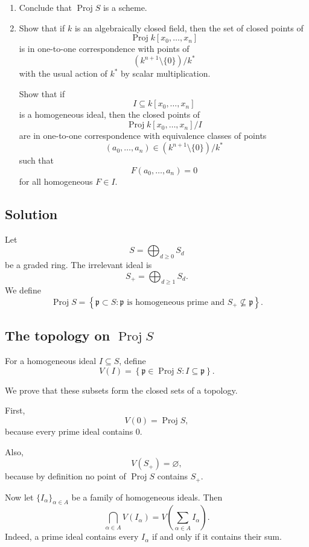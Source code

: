 \begin{enumerate}
\begin{enumerate}
		\item[(c)]
		Conclude that \(\operatorname{Proj} S\) is a scheme.
		
		\item[(d)]
		Show that if \(k\) is an algebraically closed field, then the set of closed points
		of
		\[
		\operatorname{Proj} k[x_0,\dots,x_n]
		\]
		is in one-to-one correspondence with points of
		\[
		(k^{n+1}\setminus\{0\})/k^*
		\]
		with the usual action of \(k^*\) by scalar multiplication.
		
		Show that if
		\[
		I\subseteq k[x_0,\dots,x_n]
		\]
		is a homogeneous ideal, then the closed points of
		\[
		\operatorname{Proj} k[x_0,\dots,x_n]/I
		\]
		are in one-to-one correspondence with equivalence classes of points
		\[
		(a_0,\dots,a_n)\in (k^{n+1}\setminus\{0\})/k^*
		\]
		such that
		\[
		F(a_0,\dots,a_n)=0
		\]
		for all homogeneous \(F\in I\).
	\end{enumerate}
\end{enumerate}

\subsection*{Solution}

Let
\[
S=\bigoplus_{d\ge 0}S_d
\]
be a graded ring. The irrelevant ideal is
\[
S_+ = \bigoplus_{d\ge 1}S_d.
\]
We define
\[
\operatorname{Proj} S
=
\left\{
\mathfrak p\subset S :
\mathfrak p \text{ is homogeneous prime and } S_+\not\subseteq \mathfrak p
\right\}.
\]

\subsection{The topology on \texorpdfstring{$\operatorname{Proj} S$}{Proj S}}

For a homogeneous ideal \(I\subseteq S\), define
\[
V(I)
=
\left\{
\mathfrak p\in \operatorname{Proj} S : I\subseteq \mathfrak p
\right\}.
\]

We prove that these subsets form the closed sets of a topology.

First,
\[
V(0)=\operatorname{Proj} S,
\]
because every prime ideal contains \(0\).

Also,
\[
V(S_+)=\varnothing,
\]
because by definition no point of \(\operatorname{Proj} S\) contains \(S_+\).

Now let \(\{I_\alpha\}_{\alpha\in A}\) be a family of homogeneous ideals. Then
\[
\bigcap_{\alpha\in A}V(I_\alpha)
=
V\left(\sum_{\alpha\in A}I_\alpha\right).
\]
Indeed, a prime ideal contains every \(I_\alpha\) if and only if it contains their sum.

